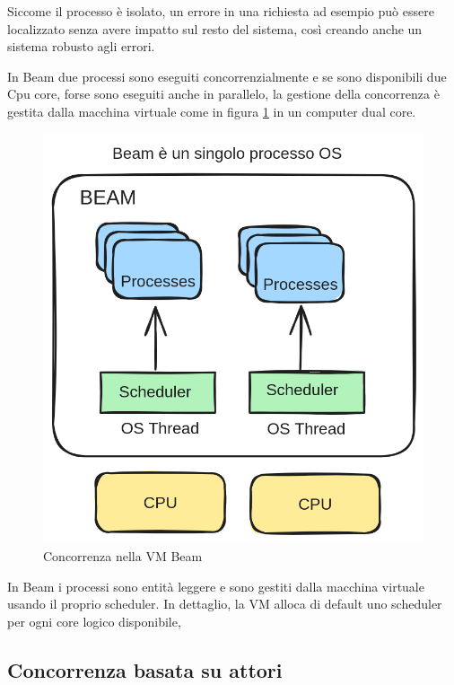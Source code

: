 Siccome il processo è isolato, un errore in una richiesta
ad esempio può essere localizzato senza avere impatto
sul resto del sistema, così creando anche un sistema robusto
agli errori.

In Beam due processi sono eseguiti concorrenzialmente e
se sono disponibili due Cpu core, forse sono eseguiti anche
in parallelo, la gestione della concorrenza è gestita
dalla macchina virtuale come in figura \ref{fig:concorrenza_beam}
in un computer dual core.


\begin{figure}[!htp]
    \centering
    \includegraphics[keepaspectratio=true,scale=0.25]{images/beam_concurrency.png}
	\caption{Concorrenza nella VM Beam \cite{elixirInAction5}}
  	\label{fig:concorrenza_beam}
\end{figure}

In Beam i processi sono entità leggere e sono gestiti
dalla macchina virtuale usando il proprio scheduler.
In dettaglio, la VM alloca di default uno scheduler per ogni
core logico disponibile, 



\subsection{Concorrenza basata su attori}

